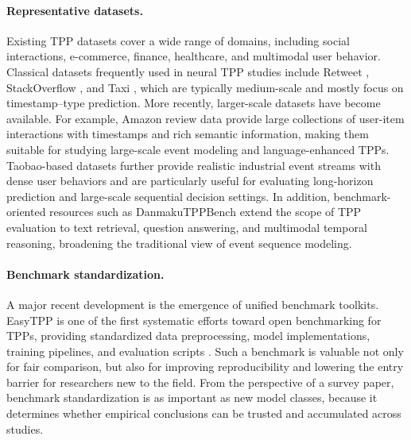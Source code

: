 \documentclass[10pt]{article} %
\begin{document}
\paragraph{Representative datasets.}
Existing TPP datasets cover a wide range of domains, including social interactions, e-commerce, finance, healthcare, and multimodal user behavior. Classical datasets frequently used in neural TPP studies include Retweet \citep{RETWEET}, StackOverflow \citep{du2016recurrent}, and Taxi \citep{whong2014foiking}, which are typically medium-scale and mostly focus on timestamp--type prediction. More recently, larger-scale datasets have become available. For example, Amazon review data \citep{ni2019justifying} provide large collections of user-item interactions with timestamps and rich semantic information, making them suitable for studying large-scale event modeling and language-enhanced TPPs. Taobao-based datasets \citep{tianchi-taobao-2018} further provide realistic industrial event streams with dense user behaviors and are particularly useful for evaluating long-horizon prediction and large-scale sequential decision settings. In addition, benchmark-oriented resources such as DanmakuTPPBench \citep{jiang2025danmakutppbench} extend the scope of TPP evaluation to text retrieval, question answering, and multimodal temporal reasoning, broadening the traditional view of event sequence modeling. 

\paragraph{Benchmark standardization.}
A major recent development is the emergence of unified benchmark toolkits. EasyTPP is one of the first systematic efforts toward open benchmarking for TPPs, providing standardized data preprocessing, model implementations, training pipelines, and evaluation scripts \citep{xueeasytpp}. Such a benchmark is valuable not only for fair comparison, but also for improving reproducibility and lowering the entry barrier for researchers new to the field. From the perspective of a survey paper, benchmark standardization is as important as new model classes, because it determines whether empirical conclusions can be trusted and accumulated across studies.
\end{document}
